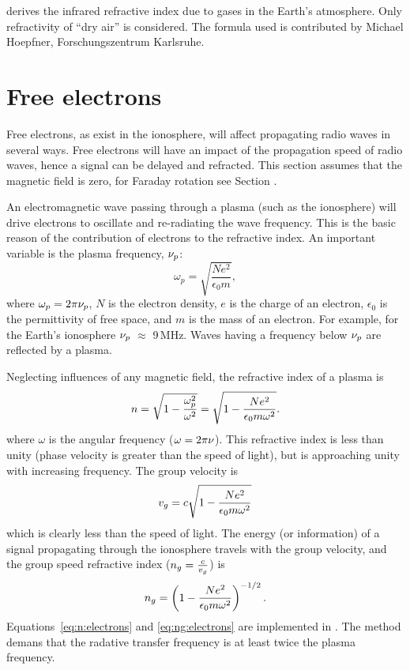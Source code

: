  derives the infrared refractive index due to gases in the Earth's atmosphere. Only refractivity of ``dry air'' is considered. The formula used is contributed by Michael Hoepfner, Forschungszentrum Karlsruhe.


\section{Free electrons}
%
Free electrons, as exist in the ionosphere, will affect propagating radio waves
in several ways. Free electrons will have an impact of the propagation speed of
radio waves, hence a signal can be delayed and refracted. This section assumes
that the magnetic field is zero, for Faraday rotation see Section .

An electromagnetic wave passing through a plasma (such as the ionosphere) will
drive electrons to oscillate and re-radiating the wave frequency. This is the
basic reason of the contribution of electrons to the refractive index. 
An important variable is the plasma frequency, $\nu_{p}$:
\begin{equation}
  \omega_{p}=\sqrt{\frac{Ne^{2}}{\epsilon_{0}m}},
\end{equation}
where \(\omega_{p}=2\pi\nu_{p}\), \(N\) is the electron density, \(e\) is the
charge of an electron, \(\epsilon_{0}\) is the permittivity of free space, and
\(m\) is the mass of an electron. For example, for the Earth's ionosphere
\(\nu_{p}\) \(\approx\) 9\,MHz.
Waves having a frequency below $\nu_{p}$ are reflected by a plasma.

Neglecting influences of any magnetic field, the refractive index of a plasma
is \citep[e.g.][]{rybicki:radia:79}
\begin{equation}
\label{eq:n:electrons}
n =\sqrt{1-\frac{\omega_{p}^{2}}{\omega^{2}}}=\sqrt{1-\frac{Ne^{2}}
{\epsilon_{0}m\omega^{2}}}.
\end{equation}
where $\omega$ is the angular frequency ($\omega=2\pi\nu$). This refractive
index is less than unity (phase velocity is greater than the speed of light),
but is approaching unity with increasing frequency. The group velocity is
\citep{rybicki:radia:79}
\begin{equation}
v_{g}=c\sqrt{1-\frac{Ne^{2}}
{\epsilon_{0}m\omega^{2}}}
\end{equation}
which is clearly less than the speed of light.
The energy (or information) of a signal propagating through the ionosphere
travels with the group velocity, and the group speed refractive
index (\(n_{g}=\frac{c}{v_{g}}\)) is
\begin{equation}
\label{eq:ng:electrons}
  n_{g}=\left(
    1-\frac{Ne^{2}}
    {\epsilon_{0}m\omega^{2}}
  \right)^{-1/2}.
\end{equation}
Equations~\ref{eq:n:electrons} and \ref{eq:ng:electrons} are implemented in
. The method demans that the radative
transfer frequency is at least twice the plasma frequency.


